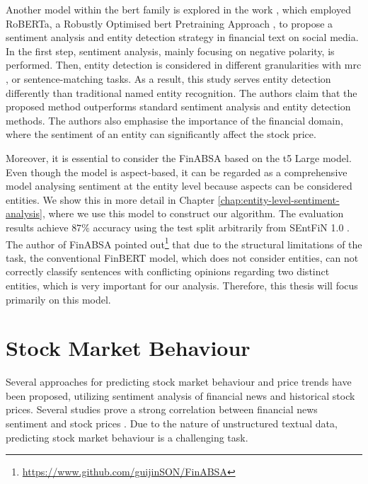 Another model within the \acrshort{bert} family is explored in the work \parencite{zhao2021bert}, which employed RoBERTa, a Robustly Optimised \acrshort{bert} Pretraining Approach \parencite{liu2019roberta}, to propose a sentiment analysis and entity detection strategy in financial text on social media. In the first step, sentiment analysis, mainly focusing on negative polarity, is performed. Then, entity detection is considered in different granularities with \acrfull{mrc} \parencite{liu2019mrc}, or sentence-matching tasks. As a result, this study serves entity detection differently than traditional named entity recognition. The authors claim that the proposed method outperforms standard sentiment analysis and entity detection methods. The authors also emphasise the importance of the financial domain, where the sentiment of an entity can significantly affect the stock price.

Moreover, it is essential to consider the FinABSA \parencite{FinABSAArticle} based on the \acrfull{t5} Large \parencite{t5Colin} model. Even though the model is aspect-based, it can be regarded as a comprehensive model analysing sentiment at the entity level because aspects can be considered entities. We show this in more detail in Chapter \ref{chap:entity-level-sentiment-analysis}, where we use this model to construct our algorithm. The evaluation results achieve $87\%$ accuracy using the test split arbitrarily from SEntFiN 1.0 \parencite{sentfin}. The author of FinABSA pointed out\footnote{\href{https://www.github.com/guijinSON/FinABSA}{https://www.github.com/guijinSON/FinABSA}} that due to the structural limitations of the task, the conventional FinBERT model, which does not consider entities, can not correctly classify sentences with conflicting opinions regarding two distinct entities, which is very important for our analysis. Therefore, this thesis will focus primarily on this model.

\section{Stock Market Behaviour}
\label{sec:predicting-stock-market-behaviour}
Several approaches for predicting stock market behaviour and price trends have been proposed, utilizing sentiment analysis of financial news and historical stock prices. Several studies prove a strong correlation between financial news sentiment and stock prices \parencite{li2014newsimpact} \parencite{Wan2021}. Due to the nature of unstructured textual data, predicting stock market behaviour is a challenging task.

